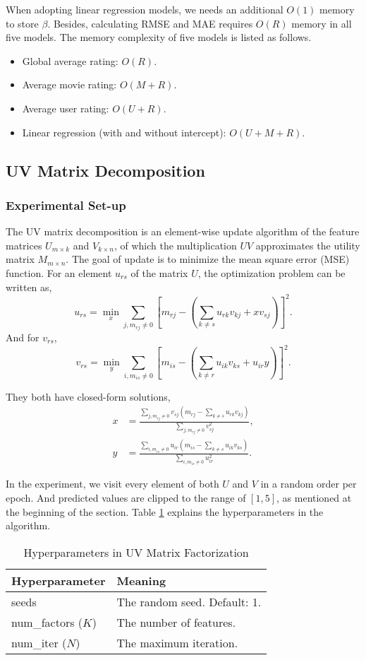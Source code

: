 \documentclass[12pt]{article}
\begin{document}
When adopting linear regression models, we needs an additional $O(1)$ memory to store $\beta$. Besides, calculating RMSE and MAE requires $O(R)$ memory in all five models. The memory complexity of five models is listed as follows.
\begin{itemize}
    \item Global average rating: $O(R)$.
    \item Average movie rating: $O(M + R)$.
    \item Average user rating: $O(U + R)$.
    \item Linear regression (with and without intercept): $O(U + M + R)$.
\end{itemize}

\subsection{UV Matrix Decomposition}
\subsubsection{Experimental Set-up}
The UV matrix decomposition is an element-wise update algorithm of the feature matrices $U_{m\times k}$ and $V_{k\times n}$, of which the multiplication $UV$ approximates the utility matrix $M_{m\times n}$. The goal of update is to minimize the mean square error (MSE) function. For an element $u_{rs}$ of the matrix $U$, the optimization problem can be written as,
\[
u_{rs} = \min_{x} \sum_{j, m_{rj}\neq 0}\left[ m_{rj}-\left( \sum_{k\neq s}u_{rk}v_{kj} + xv_{sj} \right) \right]^2.
\]
And for $v_{rs}$,
\[
v_{rs} = \min_{y} \sum_{i, m_{is}\neq 0}\left[ m_{is}-\left( \sum_{k\neq r}u_{ik}v_{ks} + u_{ir}y \right) \right]^2.
\]

They both have closed-form solutions,
\begin{align*}
x &= \frac{\sum\limits_{j, m_{rj}\neq 0}v_{sj}\left(m_{rj}-\sum\limits_{k\neq s }u_{rk}v_{kj}\right)}
{\sum\limits_{j, m_{rj}\neq 0}v_{sj}^2},\\
y &= \frac{\sum\limits_{i, m_{is}\neq 0}u_{ir}\left(m_{is}-\sum\limits_{k\neq s }u_{ik}v_{ks}\right)}
{\sum\limits_{i, m_{is}\neq 0}u_{ir}^2}. 
\end{align*}

In the experiment, we visit every element of both $U$ and $V$ in a random order per epoch. And predicted values are clipped to the range of $[1,5]$, as mentioned at the beginning of the section. Table \ref{tab:1.2-hyper} explains the hyperparameters in the algorithm.
\begin{table}[ht]
    \centering
    \caption{Hyperparameters in UV Matrix Factorization}
    \label{tab:1.2-hyper}
    \begin{tabular}{ll}
        \toprule
        \textbf{Hyperparameter} & \textbf{Meaning}\\
        \midrule
        seeds & The random seed. Default: 1.\\
        num\_factors ($K$) & The number of features.\\
        num\_iter ($N$) & The maximum iteration.\\
        \bottomrule
    \end{tabular}
\end{table}
\end{document}
